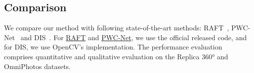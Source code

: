 




\subsection{Comparison}

We compare our method with following state-of-the-art methods: RAFT~\cite{TeedD2020a}, PWC-Net~\cite{SunYLK2018} and DIS~\cite{KroegTDV2016}.
%
For \href{https://github.com/princeton-vl/RAFT}{RAFT} and \href{https://github.com/NVlabs/PWC-Net}{PWC-Net}, we use the official released code, and for DIS, we use OpenCV's implementation.
% 
The performance evaluation comprises quantitative and qualitative evaluation on the Replica 360° and OmniPhotos datasets.


